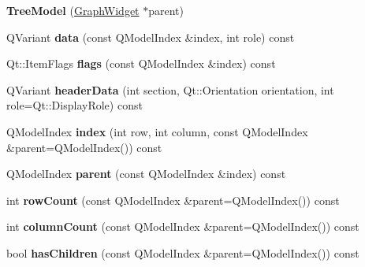 \begin{DoxyCompactItemize}
\item 
\mbox{\label{class_tree_model_ad2b13d9e94d54ba903e7f31746f2faf1}} 
{\bfseries Tree\+Model} (\hyperlink{class_graph_widget}{Graph\+Widget} $\ast$parent)
\item 
\mbox{\label{class_tree_model_a986b92267ac9cdc90519c10404192bbd}} 
Q\+Variant {\bfseries data} (const Q\+Model\+Index \&index, int role) const
\item 
\mbox{\label{class_tree_model_a2f793c5b11ec3c46571e4598ee2398e7}} 
Qt\+::\+Item\+Flags {\bfseries flags} (const Q\+Model\+Index \&index) const
\item 
\mbox{\label{class_tree_model_a59b8e296fb38595cd5459aa75dd507ba}} 
Q\+Variant {\bfseries header\+Data} (int section, Qt\+::\+Orientation orientation, int role=Qt\+::\+Display\+Role) const
\item 
\mbox{\label{class_tree_model_a0e6e6bbdb55d08be64cab7bafba2ce21}} 
Q\+Model\+Index {\bfseries index} (int row, int column, const Q\+Model\+Index \&parent=Q\+Model\+Index()) const
\item 
\mbox{\label{class_tree_model_ad29cef85c6bb0db25fb3d5b844c22e94}} 
Q\+Model\+Index {\bfseries parent} (const Q\+Model\+Index \&index) const
\item 
\mbox{\label{class_tree_model_aa741dd31a085f8a2495fc1d7feb50226}} 
int {\bfseries row\+Count} (const Q\+Model\+Index \&parent=Q\+Model\+Index()) const
\item 
\mbox{\label{class_tree_model_a7c23a1d2d39fb76e3d28aa9a0a6f365a}} 
int {\bfseries column\+Count} (const Q\+Model\+Index \&parent=Q\+Model\+Index()) const
\item 
\mbox{\label{class_tree_model_a4825c48103317ad91454acd55c8a96a6}} 
bool {\bfseries has\+Children} (const Q\+Model\+Index \&parent=Q\+Model\+Index()) const
\item 
\mbox{\label{class_tree_model_a3d73be01f01b2fb2f31561f3327ec915}} 

\end{DoxyCompactItemize}
